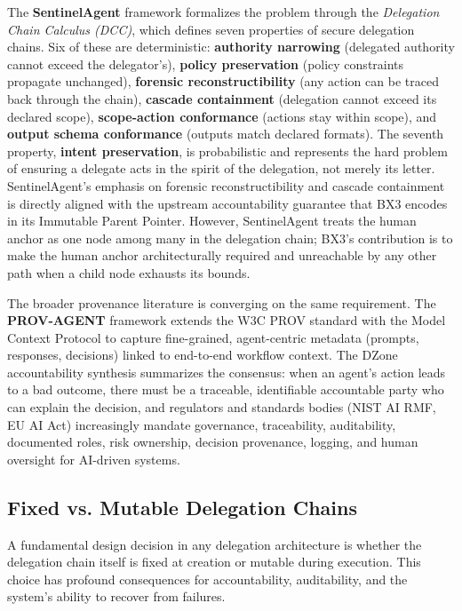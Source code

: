 The \textbf{SentinelAgent} framework \cite{sentinelagent2026} formalizes the problem through the \textit{Delegation Chain Calculus (DCC)}, which defines seven properties of secure delegation chains. Six of these are deterministic: \textbf{authority narrowing} (delegated authority cannot exceed the delegator's), \textbf{policy preservation} (policy constraints propagate unchanged), \textbf{forensic reconstructibility} (any action can be traced back through the chain), \textbf{cascade containment} (delegation cannot exceed its declared scope), \textbf{scope-action conformance} (actions stay within scope), and \textbf{output schema conformance} (outputs match declared formats). The seventh property, \textbf{intent preservation}, is probabilistic and represents the hard problem of ensuring a delegate acts in the spirit of the delegation, not merely its letter. SentinelAgent's emphasis on forensic reconstructibility and cascade containment is directly aligned with the upstream accountability guarantee that BX3 encodes in its Immutable Parent Pointer. However, SentinelAgent treats the human anchor as one node among many in the delegation chain; BX3's contribution is to make the human anchor architecturally required and unreachable by any other path when a child node exhausts its bounds.

The broader provenance literature is converging on the same requirement. The \textbf{PROV-AGENT} framework \cite{provcagent2025} extends the W3C PROV standard with the Model Context Protocol to capture fine-grained, agent-centric metadata (prompts, responses, decisions) linked to end-to-end workflow context. The DZone accountability synthesis \cite{dzone2025accountability} summarizes the consensus: when an agent's action leads to a bad outcome, there must be a traceable, identifiable accountable party who can explain the decision, and regulators and standards bodies (NIST AI RMF, EU AI Act) increasingly mandate governance, traceability, auditability, documented roles, risk ownership, decision provenance, logging, and human oversight for AI-driven systems.

\subsection{Fixed vs. Mutable Delegation Chains}

A fundamental design decision in any delegation architecture is whether the delegation chain itself is fixed at creation or mutable during execution. This choice has profound consequences for accountability, auditability, and the system's ability to recover from failures.

